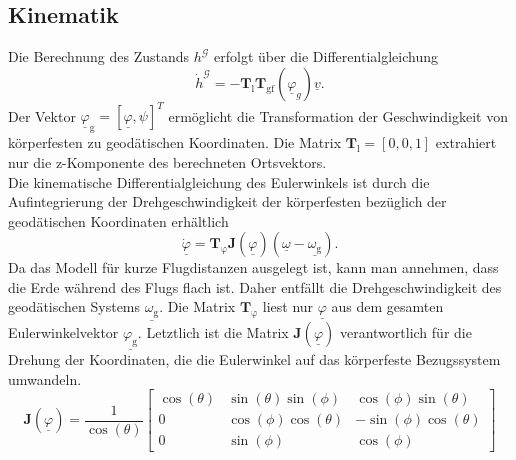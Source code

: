 \subsection{Kinematik}
Die Berechnung des Zustands $h^\mathcal{G}$ erfolgt über die Differentialgleichung 
\begin{equation}
\dot{h}^\mathcal{G} = -\textbf{T}_\mathrm{l}\textbf{T}_\mathrm{gf}(\underline{\varphi}_g)\underline{v}.
\end{equation}
Der Vektor $\underline{\varphi}_\mathrm{g} = [\underline{\varphi},\psi]^T $ ermöglicht die Transformation der Geschwindigkeit von körperfesten zu geodätischen Koordinaten. Die Matrix $\textbf{T}_\mathrm{l} = [0, 0, 1]$ extrahiert nur die z-Komponente des berechneten Ortsvektors.\\
Die kinematische Differentialgleichung des Eulerwinkels ist durch die Aufintegrierung der Drehgeschwindigkeit der körperfesten bezüglich der geodätischen Koordinaten erhältlich
\begin{equation}
\label{fun:KinEuler}
\underline{\dot{\varphi}} = \textbf{T}_\mathrm{\varphi}\textbf{J}(\underline{\varphi})(\underline{\omega}-\underline{\omega_\mathrm{g}}).
\end{equation}
Da das Modell für kurze Flugdistanzen ausgelegt ist, kann man annehmen, dass die Erde während des Flugs flach ist. Daher entfällt die Drehgeschwindigkeit des geodätischen Systems $\underline{\omega_\mathrm{g}}$. Die Matrix $\textbf{T}_\mathrm{\varphi}$ liest nur $\underline{\varphi}$ aus dem gesamten Eulerwinkelvektor $\underline{\varphi_\mathrm{g}}$. Letztlich ist die Matrix $\textbf{J}(\underline{\varphi})$ verantwortlich für die Drehung der Koordinaten, die die Eulerwinkel auf das körperfeste Bezugssystem umwandeln.
\begin{equation}
\textbf{J}(\underline{\varphi}) = \dfrac{1}{\cos(\theta)}\begin{bmatrix} 
\cos(\theta) & \sin(\theta)\sin(\phi)&\cos(\phi)\sin(\theta)\\
0&\cos(\phi)\cos(\theta)&-\sin(\phi)\cos(\theta)\\
0&\sin(\phi)& \cos(\phi)
\end{bmatrix}
\end{equation}
